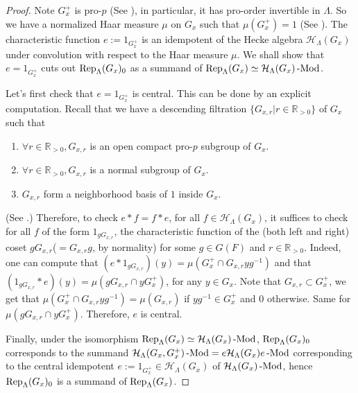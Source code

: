 	\begin{proof}
		Note $G_x^+$ is pro-$p$ (See \cite[II.5.2.(b)]{vigneras1996representations}), in particular, it has pro-order invertible in $\Lambda$. So we have a normalized Haar measure $\mu$ on $G_x$ such that $\mu(G_x^+)=1$ (See \cite[I.2.4]{vigneras1996representations}). The characteristic function $e:=1_{G_x^+}$ is an idempotent of the Hecke algebra $\mathcal{H}_{\Lambda}(G_x)$ under convolution with respect to the Haar measure $\mu$. We shall show that $e=1_{G_x^+}$ cuts out $\operatorname{\operatorname{Rep}}_{\Lambda}(G_x)_0$ as a summand of $\operatorname{\operatorname{Rep}}_{\Lambda}(G_x) \simeq \mathcal{H}_{\Lambda}(G_x)\operatorname{-Mod}$.
		
		Let's first check that $e=1_{G_x^+}$ is central. This can be done by an explicit computation. Recall that we have a descending filtration $\{G_{x,r} | r\in \mathbb{R}_{>0}\}$ of $G_x$ such that 
		\begin{enumerate}
			\item $\forall r \in \mathbb{R}_{>0}, G_{x,r}$ is an open compact pro-$p$ subgroup of $G_x$.
			\item $\forall r \in \mathbb{R}_{>0}, G_{x,r}$ is a normal subgroup of $G_x$.
			\item $G_{x,r}$ form a neighborhood basis of $1$ inside $G_x$. 
		\end{enumerate}
		(See \cite[II.5.1]{vigneras1996representations}.) Therefore, to check $e \ast f=f \ast e$, for all $f \in \mathcal{H}_{\Lambda}(G_x)$, it suffices to check for all $f$ of the form $1_{gG_{x,r}}$, the characteristic function of the (both left and right) coset $gG_{x,r}$($=G_{x,r}g$, by normality) for some $g \in G(F)$ and $r \in \mathbb{R}_{>0}$. Indeed, one can compute that $(e \ast 1_{gG_{x,r}})(y)=\mu(G_x^+\cap G_{x,r}yg^{-1})$ and that $(1_{gG_{x,r}} \ast e)(y)=\mu(gG_{x,r}\cap yG_x^+)$, for any $y \in G_x$. Note that $G_{x,r} \subset G_x^+$, we get that $\mu(G_x^+\cap G_{x,r}yg^{-1})=\mu(G_{x,r})$ if $yg^{-1} \in G_x^+$ and $0$ otherwise. Same for $\mu(gG_{x,r}\cap yG_x^+)$. Therefore, $e$ is central.
		
		
		Finally, under the isomorphism $\operatorname{\operatorname{Rep}}_{\Lambda}(G_x) \simeq \mathcal{H}_{\Lambda}(G_x)\operatorname{-Mod}$, $\operatorname{\operatorname{Rep}}_{\Lambda}(G_x)_0$ corresponds to the summand $\mathcal{H}_{\Lambda}(G_x, G_x^+)\operatorname{-Mod}=e\mathcal{H}_{\Lambda}(G_x)e\operatorname{-Mod}$ corresponding to the central idempotent $e:=1_{G_x^+} \in \mathcal{H}_{\Lambda}(G_x)$ of $\mathcal{H}_{\Lambda}(G_x)\operatorname{-Mod}$, hence $\operatorname{\operatorname{Rep}}_{\Lambda}(G_x)_0$ is a summand of $\operatorname{\operatorname{Rep}}_{\Lambda}(G_x)$. 
	\end{proof}
	
